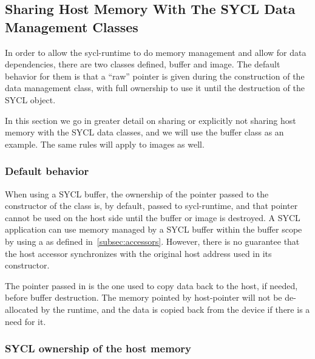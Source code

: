 \subsection{Sharing Host Memory With The SYCL Data Management Classes}
\label{sec:sharing-host-memory-with-dm}

In order to allow the \gls{sycl-runtime} to do memory management and allow
for data dependencies, there are two classes defined, buffer and image. The
default behavior for them is that a ``raw'' pointer is given during the
construction of the data management class, with full ownership to use it until
the destruction of the SYCL object.

In this section we go in greater detail on  sharing or explicitly not
sharing host memory with the SYCL data classes, and we will use the buffer
class as an example. The same rules will apply to images as well.


\subsubsection{Default behavior}

When using a SYCL buffer, the ownership of the pointer passed to the constructor
of the class is, by default, passed to \gls{sycl-runtime}, and that pointer cannot be used
on the host side until the buffer or image is destroyed.
A SYCL application can use memory managed by a SYCL buffer within the buffer scope
by using a  as defined in~\ref{subsec:accessors}.
However, there is no guarantee that the host accessor synchronizes with the 
original host address used in its constructor.

The pointer passed in is the one used to copy data back to the host, if needed,
before buffer destruction.  The memory pointed by \gls{host-pointer}
will not be de-allocated by the runtime,
and the data is copied back from the device if there is
a need for it.


\subsubsection{SYCL ownership of the host memory}

